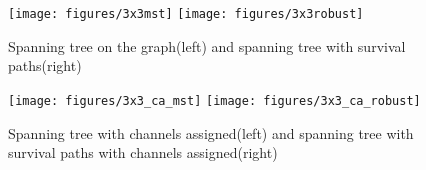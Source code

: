    \begin{figure}[h!]
      \centering
      \texttt{[image: figures/3x3mst]}
      \texttt{[image: figures/3x3robust]}
      \caption{Spanning tree on the graph(left) and spanning tree with survival paths(right)}
      \label{fig:3x3second}
    \end{figure}
    
    \begin{figure}[h!]
      \centering
      \texttt{[image: figures/3x3\_ca\_mst]}
      \texttt{[image: figures/3x3\_ca\_robust]}
      \caption{Spanning tree with channels assigned(left) and spanning tree with survival paths with channels assigned(right)}
      \label{fig:3x3third}
    \end{figure}
    
    \newpage
  
